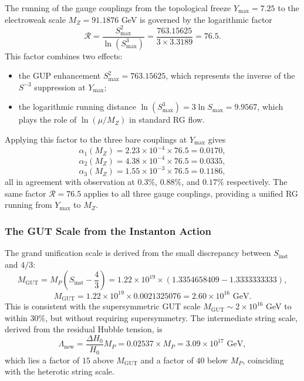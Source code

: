 \documentclass[12pt,oneside,openany]{book}
\begin{document}
The running of the gauge couplings from the topological freeze $Y_{\max} = 7.25$ to the electroweak scale $M_Z = 91.1876$ GeV is governed by the logarithmic factor
\begin{equation}
\boxed{\mathcal{R} = \frac{S_{\max}^2}{\ln(S_{\max}^3)} = \frac{763.15625}{3 \times 3.3189} = 76.5.}
\label{eq:R-factor}
\end{equation}
This factor combines two effects:
\begin{itemize}
\item the GUP enhancement $S_{\max}^2 = 763.15625$, which represents the inverse of the $S^{-3}$ suppression at $Y_{\max}$;
\item the logarithmic running distance $\ln(S_{\max}^3) = 3 \ln S_{\max} = 9.9567$, which plays the role of $\ln(\mu/M_Z)$ in standard RG flow.
\end{itemize}
Applying this factor to the three bare couplings at $Y_{\max}$ gives
\begin{equation}
\alpha_1(M_Z) = 2.23 \times 10^{-4} \times 76.5 = 0.0170,
\label{eq:run1}
\end{equation}
\begin{equation}
\alpha_2(M_Z) = 4.38 \times 10^{-4} \times 76.5 = 0.0335,
\label{eq:run2}
\end{equation}
\begin{equation}
\alpha_3(M_Z) = 1.55 \times 10^{-3} \times 76.5 = 0.1186,
\label{eq:run3}
\end{equation}
all in agreement with observation at $0.3\%$, $0.88\%$, and $0.17\%$ respectively. The same factor $\mathcal{R} = 76.5$ applies to all three gauge couplings, providing a unified RG running from $Y_{\max}$ to $M_Z$.

\subsubsection{The GUT Scale from the Instanton Action}

The grand unification scale is derived from the small discrepancy between $S_{\mathrm{inst}}$ and $4/3$:
\begin{equation}
M_{\mathrm{GUT}} = M_P \left(S_{\mathrm{inst}} - \frac{4}{3}\right) = 1.22 \times 10^{19} \times (1.3354658409 - 1.3333333333),
\label{eq:MGUT-def}
\end{equation}
\begin{equation}
M_{\mathrm{GUT}} = 1.22 \times 10^{19} \times 0.0021325076 = 2.60 \times 10^{16} \text{ GeV}.
\label{eq:MGUT-num}
\end{equation}
This is consistent with the supersymmetric GUT scale $M_{\mathrm{GUT}} \sim 2 \times 10^{16}$ GeV to within $30\%$, but without requiring supersymmetry. The intermediate string scale, derived from the residual Hubble tension, is
\begin{equation}
\Lambda_{\mathrm{new}} = \frac{\Delta H_0}{H_0} M_P = 0.02537 \times M_P = 3.09 \times 10^{17} \text{ GeV},
\label{eq:Lambdanew}
\end{equation}
which lies a factor of $15$ above $M_{\mathrm{GUT}}$ and a factor of $40$ below $M_P$, coinciding with the heterotic string scale.
\end{document}
